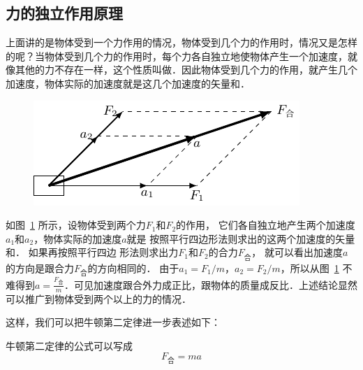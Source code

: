 \subsection{力的独立作用原理}
上面讲的是物体受到一个力作用的情况，物体受到几个力的作用时，情况又是怎样的呢？当物体受到几个力的作用时，每个力各自独立地使物体产生一个加速度，就像其他的力不存在一样，这个性质叫做．因此物体受到几个力的作用，就产生几个加速度，物体实际的加速度就是这几个加速度的矢量和．
\begin{figure}[htbp]
    \centering
    \includegraphics{fig/A/3-7.pdf}
    \caption{}\label{fig_A_3-7}
\end{figure}

如图~\ref{fig_A_3-7} 所示，设物体受到两个力$F_1$和$F_2$的作用，
它们各自独立地产生两个加速度$a_1$和$a_2$，物体实际的加速度$a$就是
按照平行四边形法则求出的这两个加速度的矢量和．
如果再按照平行四边
形法则求出力$F_1$和$F_2$的合力$F_{\text{合}}$，
就可以看出加速度$a$的方向是跟合力$F_{\text{合}}$的方向相同的．
由于$a_1=F_1/m$，$a_2=F_2/m$，所以从图~\ref{fig_A_3-7} 不难得到$a=\frac{F_{\text{合}}}{m}$．可见加速度跟合外力成正比，跟物体的质量成反比．上述结论显然可以推广到物体受到两个以上的力的情况．

这样，我们可以把牛顿第二定律进一步表述如下：


牛顿第二定律的公式可以写成
\[F_{\text{合}}=ma\]


